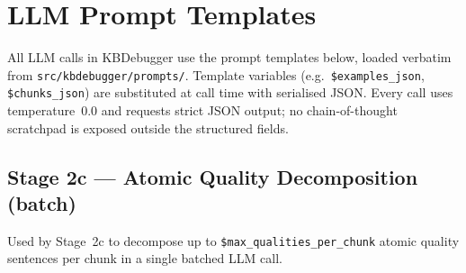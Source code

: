 \appendix

\section{LLM Prompt Templates}
\label{app:prompts}

All LLM calls in KBDebugger use the prompt templates below, loaded
verbatim from \texttt{src/kbdebugger/prompts/}.  Template variables
(e.g.\ \texttt{\$examples\_json}, \texttt{\$chunks\_json}) are
substituted at call time with serialised JSON.  Every call uses
temperature~0.0 and requests strict JSON output; no chain-of-thought
scratchpad is exposed outside the structured fields.

\subsection{Stage 2c — Atomic Quality Decomposition (batch)}
\label{app:prompt-decompose-batch}

Used by Stage~2c to decompose up to \texttt{\$max\_qualities\_per\_chunk}
atomic quality sentences per chunk in a single batched LLM call.

